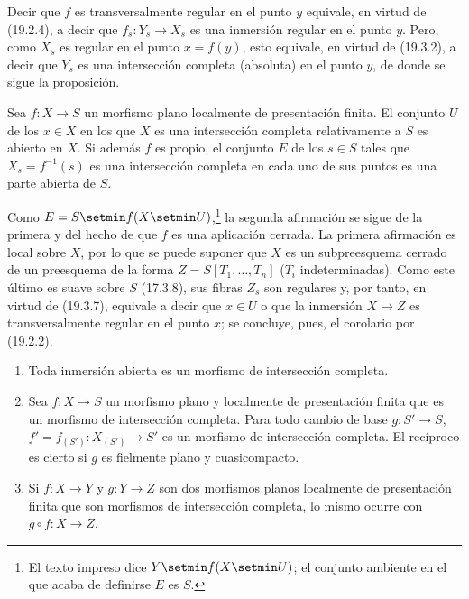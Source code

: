 Decir que $f$ es transversalmente regular en el punto $y$ equivale, en virtud de (19.2.4), a decir que $f_s:Y_s\to X_s$ es una inmersión regular en el punto $y$. Pero, como $X_s$ es regular en el punto $x=f(y)$, esto equivale, en virtud de (19.3.2), a decir que $Y_s$ es una intersección completa (absoluta) en el punto $y$, de donde se sigue la proposición.

\begin{corollary}[19.3.8]
\label{IV.19.3.8}
Sea $f:X\to S$ un morfismo plano localmente de presentación finita. El conjunto $U$ de los $x\in X$ en los que $X$ es una intersección completa relativamente a $S$ es abierto en $X$. Si además $f$ es propio, el conjunto $E$ de los $s\in S$ tales que $X_s=f^{-1}(s)$ es una intersección completa en cada uno de sus puntos es una parte abierta de $S$.
\end{corollary}

Como $E=S\setmin f(X\setmin U)$,\footnote{El texto impreso dice $Y\setmin f(X\setmin U)$; el conjunto ambiente en el que acaba de definirse $E$ es $S$.} la segunda afirmación se sigue de la primera y del hecho de que $f$ es una aplicación cerrada. La primera afirmación es local sobre $X$, por lo que se puede suponer que $X$ es un subpreesquema cerrado de un preesquema de la forma $Z=S[T_1,\ldots,T_n]$ ($T_i$ indeterminadas). Como este último es suave sobre $S$ (17.3.8), sus fibras $Z_s$ son regulares y, por tanto, en virtud de (19.3.7), equivale a decir que $x\in U$ o que la inmersión $X\to Z$ es transversalmente regular en el punto $x$; se concluye, pues, el corolario por (19.2.2).

\begin{proposition}[19.3.9]
\label{IV.19.3.9}
\begin{enumerate}
  \item[\textup{(i)}] Toda inmersión abierta es un morfismo de intersección completa.
  \item[\textup{(ii)}] Sea $f:X\to S$ un morfismo plano y localmente de presentación finita que es un morfismo de intersección completa. Para todo cambio de base $g:S'\to S$, $f'=f_{(S')}:X_{(S')}\to S'$ es un morfismo de intersección completa. El recíproco es cierto si $g$ es fielmente plano y cuasicompacto.
  \item[\textup{(iii)}] Si $f:X\to Y$ y $g:Y\to Z$ son dos morfismos planos localmente de presentación finita que son morfismos de intersección completa, lo mismo ocurre con $g\circ f:X\to Z$.
\end{enumerate}
\end{proposition}

